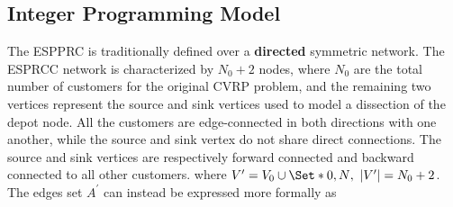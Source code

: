 \begin{comment}

[MY OWN STUFF, kept for reference purpose. TODO: Merge or delete later]
\subsection{Shortest Path Problem with Resource Constraints}
If there are no negative cost cyles, e.g. when the reduced cost variables are positive $\bar{c_{ij}} \ge 0$,
the ESPPRC problem is solvable in polynomial time, since the elementarity conditions are guaranteed
to be satisfied in this case.
In this particular case, some authors have proposed efficient methods to tackle this case:
\cite{beasley1989}, \cite{carlyle2008}, \cite{dumitrescu2003}, \cite{muhandiramge2009}.
These proposed approaches work under the assumption that no negative cost cycle is present,
and use lagrangian relaxation to relax the capacity constraints.

\subsection{Elementary Shortest Path Problem with Resource Constraints}
In the case where the network may be contain negative cost cycles, the
elementarity condition must be explicitly modeled, or relaxed, in order
to obtain reasonable dual bound solutions for the CVRP.
\textcite{feillet2004} proposes a dynamic programming algorithm where
the elementary property is handled through the usage of an additional resource
bound to each node.
\textcite{righini2006} proposes a bi-directional dynamic programming algorithm to solve the ESPPRC.
\end{comment}

\subsection{Integer Programming Model}
\label{sec:espprc-integer-programming-model}
The ESPPRC is traditionally defined over a \textbf{directed}
symmetric network.
The ESPRCC network is characterized by $N_0 + 2$ nodes,
where $N_0$ are the total number of customers for the original CVRP problem,
and the remaining two vertices represent the source and sink vertices used to
model a dissection of the depot node.
All the customers are edge-connected in both directions with one another,
while the source and sink vertex do not share direct connections.
The source and sink vertices are respectively forward connected and backward connected to all other customers.
where $V^\prime = V_0 \cup \Set*{0, N},\ |V^\prime| = N_0 + 2$.
The edges set $A^\prime$ can instead be expressed more formally as


